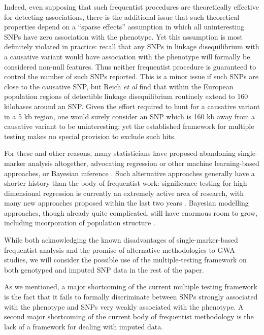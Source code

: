 \documentclass[12pt]{article}
\begin{document}
Indeed, even supposing that such frequentist procedures are
theoretically effective for detecting associations,
there is the additional issue that such theoretical properties
depend on a ``sparse effects'' assumption in which all uninteresting
SNPs have zero association with the phenotype.
Yet this assumption is most definitely violated in practice:
recall that any SNPs in linkage disequilibrium with a causative variant
would have association with the phenotype will formally
be considered non-null features.
Thus neither frequentist procedure is guaranteed to control
the number of such SNPs reported.
This is a minor issue if such SNPs are close to the causative SNP,
but Reich \emph{et al} \cite{Reich2001} find that within the European population
regions of detectible linkage disequilibrium routinely extend to 160
kilobases around an SNP.
Given the effort required to hunt for a causative variant
in a 5 kb region, one would surely consider an SNP which is 160 kb
away from a causative variant to be uninteresting; yet
the established framework for multiple testing makes no special
provision to exclude such hits.

For these and other reasons, 
many statisticians have proposed abandoning single-marker analysis altogether,
advocating regression \cite{Frommlet2010} or other machine
learning-based approaches, or Bayesian inference \cite{Servin2007}.
Such alternative approaches generally have a shorter history than
the body of frequentist work: significance testing for
high-dimensional regression is currently an extremely active area of
research,
with many new approaches proposed within the last two years
\cite{Bogdan2013}\cite{Javanmard2013}\cite{Taylor}.
Bayesian modelling approaches, though already quite complicated,
still have enormous room to grow, including incorporation
of population structure \cite{Stephens2009}.

While both acknowledging the known disadvantages of single-marker-based
frequentist analysis and the promise of alternative methodologies to
GWA studies, we will consider the possible use of the multiple-testing
framework on both genotyped and imputed SNP data in the rest of the
paper.

As we mentioned, a major shortcoming of the current multiple testing
framework is the fact that it fails to formally discriminate between
SNPs strongly associated with the phenotype and SNPs very weakly
associated with the phenotype.  
A second major shortcoming of the current body of frequentist
methodology is the lack of a framework for dealing with imputed data.
\end{document}
